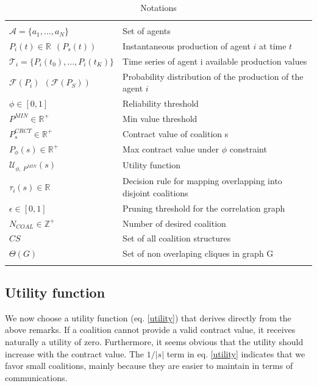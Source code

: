 \documentclass[conference]{IEEEtran}
\begin{document}
\begin{table}[t]
\centering
\scriptsize
\begin{tabular}{l|p{4.5cm}}
  \hline 
  \\
  $ \mathcal{A}=\{a_{1},...,a_{N}\} $ & Set of agents \\
  $ P_{i}(t) \in \mathbb{R}\ \ (P_{s}(t)) $ & Instantaneous production of agent $i$ at time $t$ \\
  $ \mathcal{T}_{i} = \{P_{i}(t_{0}),...,P_{i}(t_{K})\} $ & Time series of agent i available production values \\
  $ \mathcal{F}(P_{i})\ \ (\mathcal{F}(P_{S})) $ & Probability distribution of the production of the agent $i$ \\
  $ \phi \in [0,1] $ & Reliability threshold \\
  $ P^{MIN} \in \mathbb{R}^+ $ & Min value threshold \\
  $ P_{s}^{CRCT} \in \mathbb{R}^+ $ & Contract value of coalition s \\
  $ P_{\phi}(s) \in \mathbb{R}^+ $ & Max contract value under $ \phi $ constraint \\
  $ \mathcal{U}_{\phi,\ P^{MIN}}(s) $ & Utility function \\
  $ \tau_{i}(s) \in \mathbb{R}$ & Decision rule for mapping overlapping into disjoint coalitions \\
  $ \epsilon \in [0,1] $ & Pruning threshold for the correlation graph \\
  $ N_{COAL} \in \mathbb{Z}^+ $ & Number of desired coalition \\
  $ CS $ & Set of all coalition structures \\
  $ \Theta(G) $ & Set of non overlaping cliques in graph G \\
  \\
  \hline
\end{tabular}

\caption{Notations\label{table1}}
\end{table}

\subsection{Utility function}\label{subsec:UtilityFunc}
We now choose a utility function (eq. \ref{utility}) that derives directly from the above remarks. If a coalition cannot provide a valid contract value, it receives naturally a utility of zero. Furthermore, it seems obvious that the utility should increase with the contract value. The $ 1/|s| $ term in eq. \ref{utility} indicates that we favor small coalitions, mainly because they are easier to maintain in terms of communications.
\end{document}
